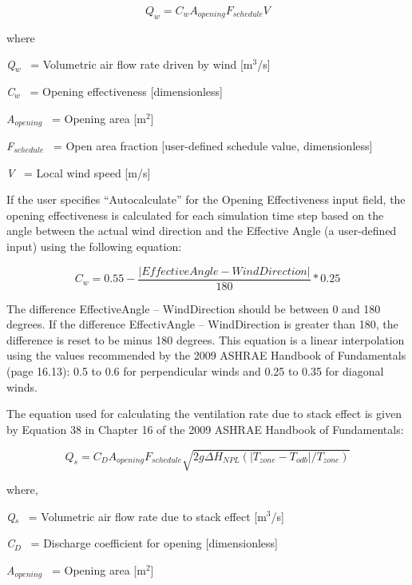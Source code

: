 \begin{equation}
{Q_w} = {C_w}{A_{opening}}{F_{schedule}}V
\end{equation}

where

\emph{Q\(_{w}\)}~ = Volumetric air flow rate driven by wind {[}m\(^{3}\)/s{]}

\emph{C\(_{w}\)}~ = Opening effectiveness {[}dimensionless{]}

\emph{A\(_{opening}\)}~ = Opening area {[}m\(^{2}\){]}

\emph{F\(_{schedule}\)}~ = Open area fraction {[}user-defined schedule value, dimensionless{]}

\emph{V}~ = Local wind speed {[}m/s{]}

If the user specifies ``Autocalculate'' for the Opening Effectiveness input field, the opening effectiveness is calculated for each simulation time step based on the angle between the actual wind direction and the Effective Angle (a user-defined input) using the following equation:

\begin{equation}
{C_w} = 0.55 - \frac{{\left| {EffectiveAngle - WindDirection} \right|}}{{180}}*0.25
\end{equation}

The difference \textbar{}EffectiveAngle -- WindDirection\textbar{} should be between 0 and 180 degrees. If the difference \textbar{}EffectivAngle -- WindDirection\textbar{} is greater than 180, the difference is reset to be minus 180 degrees. This equation is a linear interpolation using the values recommended by the 2009 ASHRAE Handbook of Fundamentals (page 16.13): 0.5 to 0.6 for perpendicular winds and 0.25 to 0.35 for diagonal winds.

The equation used for calculating the ventilation rate due to stack effect is given by Equation 38 in Chapter 16 of the 2009 ASHRAE Handbook of Fundamentals:

\begin{equation}
{Q_s} = {C_D}{A_{opening}}{F_{schedule}}\sqrt {2g\Delta {H_{NPL}}(|{T_{zone}} - {T_{odb}}|/{T_{zone}})}
\end{equation}

where,

\emph{Q\(_{s}\)}~ = Volumetric air flow rate due to stack effect {[}m\(^{3}\)/s{]}

\emph{C\(_{D}\)}~ = Discharge coefficient for opening {[}dimensionless{]}

\emph{A\(_{opening}\)}~ = Opening area {[}m\(^{2}\){]}

